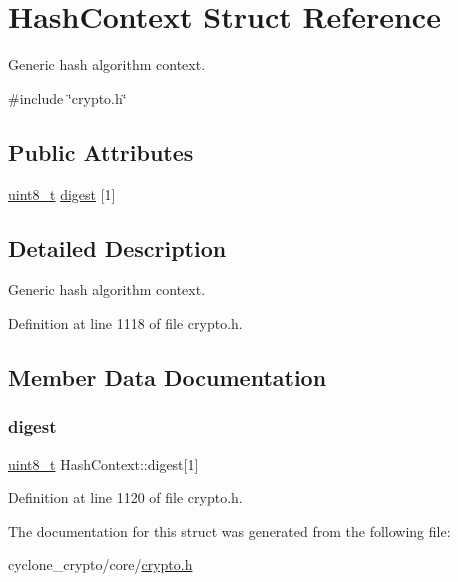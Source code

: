 \hypertarget{structHashContext}{}\section{Hash\+Context Struct Reference}
\label{structHashContext}


Generic hash algorithm context.  




{\ttfamily \#include \char`\"{}crypto.\+h\char`\"{}}

\subsection*{Public Attributes}
\begin{DoxyCompactItemize}
\item 
\hyperlink{stdint_8h_aba7bc1797add20fe3efdf37ced1182c5}{uint8\+\_\+t} \hyperlink{structHashContext_a846e5b08172b00162569c343caa0eae1}{digest} \mbox{[}1\mbox{]}
\end{DoxyCompactItemize}


\subsection{Detailed Description}
Generic hash algorithm context. 

Definition at line 1118 of file crypto.\+h.



\subsection{Member Data Documentation}
\mbox{\label{structHashContext_a846e5b08172b00162569c343caa0eae1}} 
\subsubsection{\texorpdfstring{digest}{digest}}
{\footnotesize\ttfamily \hyperlink{stdint_8h_aba7bc1797add20fe3efdf37ced1182c5}{uint8\+\_\+t} Hash\+Context\+::digest\mbox{[}1\mbox{]}}



Definition at line 1120 of file crypto.\+h.



The documentation for this struct was generated from the following file\+:\begin{DoxyCompactItemize}
\item 
cyclone\+\_\+crypto/core/\hyperlink{cyclone__crypto_2core_2crypto_8h}{crypto.\+h}\end{DoxyCompactItemize}
